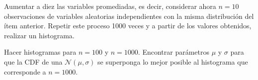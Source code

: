 \documentclass[a4paper,oneside,fleqn,11pt]{article}
\newcommand\N{\mathcal{N}}
\begin{document}
\begin{ejercicios}
\begin{ejitems}
\item Aumentar a diez las variables promediadas, es decir, considerar ahora $n
= 10$ observaciones de variables aleatorias independientes con la misma
distribución del ítem anterior. Repetir este proceso 1000 veces y a partir de
los valores obtenidos, realizar un histograma.

\item Hacer histogramas para $n = 100$ y $n=1000$. Encontrar parámetros $\mu$
y $\sigma$ para que la CDF de una $\N(\mu,\sigma)$ se superponga lo mejor
posible al histograma que corresponde a $n=1000$.
\end{ejitems}

\end{ejercicios}
\end{document}
